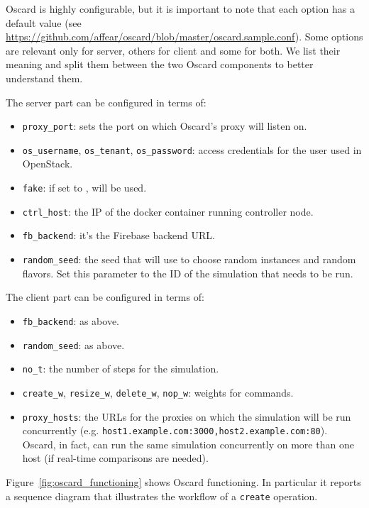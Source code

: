 Oscard is highly configurable, but it is important to note that each option has a default value (see \url{https://github.com/affear/oscard/blob/master/oscard.sample.conf}). Some options are relevant only for server, others for client and some for both. We list their meaning and split them between the two Oscard components to better understand them.

The server part can be configured in terms of:
\begin{itemize}
	\item \texttt{proxy\_port}: sets the port on which Oscard's proxy will listen on.
	\item \texttt{os\_username}, \texttt{os\_tenant}, \texttt{os\_password}: access credentials for the user used in OpenStack.
	\item \texttt{fake}: if set to ,  will be used.
	\item \texttt{ctrl\_host}: the IP of the docker container running controller node.
	\item \texttt{fb\_backend}: it's the Firebase backend URL.
	\item \texttt{random\_seed}: the seed that  will use to choose random instances and random flavors. Set this parameter to the ID of the simulation that needs to be run.
\end{itemize}

The client part can be configured in terms of:
\begin{itemize}
	\item \texttt{fb\_backend}: as above.
	\item \texttt{random\_seed}: as above.
	\item \texttt{no\_t}: the number of steps for the simulation.
	\item \texttt{create\_w}, \texttt{resize\_w}, \texttt{delete\_w}, \texttt{nop\_w}: weights for commands.
	\item \texttt{proxy\_hosts}: the URLs for the proxies on which the simulation will be run concurrently (e.g. \texttt{host1.example.com:3000,host2.example.com:80}). Oscard, in fact, can run the same simulation concurrently on more than one host (if real-time comparisons are needed).
\end{itemize}

Figure~\ref{fig:oscard_functioning} shows Oscard functioning. In particular it reports a sequence diagram that illustrates the workflow of a \texttt{create} operation. 


